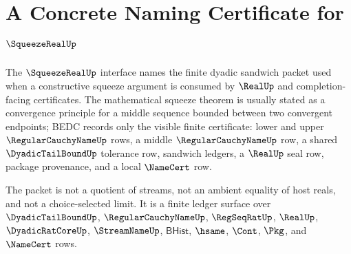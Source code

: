 \chapter{A Concrete Naming Certificate for $\SqueezeRealUp$}
\label{ch:concrete-instances-squeezereal-namecert}

The $\SqueezeRealUp$ interface names the finite dyadic sandwich packet used when a constructive squeeze argument is consumed by $\RealUp$ and completion-facing certificates. The mathematical squeeze theorem is usually stated as a convergence principle for a middle sequence bounded between two convergent endpoints; BEDC records only the visible finite certificate: lower and upper $\RegularCauchyNameUp$ rows, a middle $\RegularCauchyNameUp$ row, a shared $\DyadicTailBoundUp$ tolerance row, sandwich ledgers, a $\RealUp$ seal row, package provenance, and a local $\NameCert$ row.

The packet is not a quotient of streams, not an ambient equality of host reals, and not a choice-selected limit. It is a finite ledger surface over $\DyadicTailBoundUp$, $\RegularCauchyNameUp$, $\RegSeqRatUp$, $\RealUp$, $\DyadicRatCoreUp$, $\StreamNameUp$, $\mathsf{BHist}$, $\hsame$, $\Cont$, $\Pkg$, and $\NameCert$ rows.

